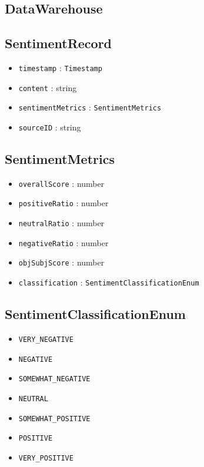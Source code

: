 \documentclass[12pt]{article}
\begin{document}
\subsection{DataWarehouse}

\subsection{SentimentRecord}
\begin{itemize}
  \item \texttt{timestamp} : \texttt{Timestamp}
  \item \texttt{content} : string
  \item \texttt{sentimentMetrics} : \texttt{SentimentMetrics}
  \item \texttt{sourceID} : string
\end{itemize}

\subsection{SentimentMetrics}
\begin{itemize}
  \item \texttt{overallScore} : number
  \item \texttt{positiveRatio} : number
  \item \texttt{neutralRatio} : number
  \item \texttt{negativeRatio} : number
  \item \texttt{objSubjScore} : number
  \item \texttt{classification} : \texttt{SentimentClassificationEnum}
\end{itemize}

\subsection{SentimentClassificationEnum}
\begin{itemize}
  \item \texttt{VERY\_NEGATIVE}
  \item \texttt{NEGATIVE}
  \item \texttt{SOMEWHAT\_NEGATIVE}
  \item \texttt{NEUTRAL}
  \item \texttt{SOMEWHAT\_POSITIVE}
  \item \texttt{POSITIVE}
  \item \texttt{VERY\_POSITIVE}
\end{itemize}
\end{document}
